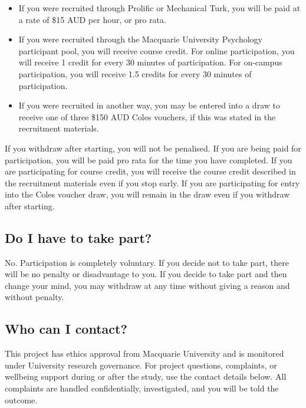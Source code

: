 \documentclass[letterpaper, 10pt]{article}
\let\oldsubsection\subsection
\renewcommand{\subsection}[1]{%
  \Needspace{10\baselineskip}%
  \oldsubsection{#1}%
}
\begin{document}
\begin{itemize}
\item If you were recruited through Prolific or Mechanical
    Turk, you will be paid at a rate of \$15 AUD per hour,
    or pro rata.

\item If you were recruited through the Macquarie University
    Psychology participant pool, you will receive course
    credit. For online participation, you will receive 1
    credit for every 30 minutes of participation. For
    on-campus participation, you will receive 1.5 credits
    for every 30 minutes of participation.

\item If you were recruited in another way, you may be
    entered into a draw to receive one of three \$150 AUD Coles
    vouchers, if this was stated in the recruitment
    materials.
\end{itemize}

If you withdraw after starting, you will not be penalised.
If you are being paid for participation, you will be paid
pro rata for the time you have completed. If you are
participating for course credit, you will receive the course
credit described in the recruitment materials even if you
stop early. If you are participating for entry into the
Coles voucher draw, you will remain in the draw even if you
withdraw after starting.

\subsection{Do I have to take part?}
No. Participation is completely voluntary. If you decide not
to take part, there will be no penalty or disadvantage to
you. If you decide to take part and then change your mind,
you may withdraw at any time without giving a reason and
without penalty.

\subsection{Who can I contact?}
This project has ethics approval from Macquarie University
and is monitored under University research governance.  For
project questions, complaints, or wellbeing support during
or after the study, use the contact details below. All
complaints are handled confidentially, investigated, and you
will be told the outcome.
\end{document}
